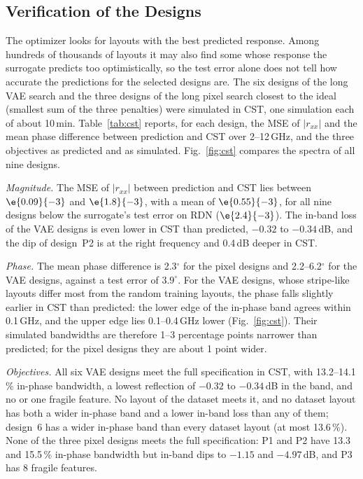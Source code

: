 \subsection{Verification of the Designs}
The optimizer looks for layouts with the best predicted response. Among hundreds of thousands of layouts it may also find some whose response the surrogate predicts too optimistically, so the test error alone does not tell how accurate the predictions for the selected designs are. The six designs of the long VAE search and the three designs of the long pixel search closest to the ideal (smallest sum of the three penalties) were simulated in CST, one simulation each of about 10\,min. Table~\ref{tab:cst} reports, for each design, the MSE of $|r_{xx}|$ and the mean phase difference between prediction and CST over 2--12\,GHz, and the three objectives as predicted and as simulated. Fig.~\ref{fig:cst} compares the spectra of all nine designs.

\emph{Magnitude.} The MSE of $|r_{xx}|$ between prediction and CST lies between $\e{0.09}{-3}$ and $\e{1.8}{-3}$, with a mean of $\e{0.55}{-3}$, for all nine designs below the surrogate's test error on RDN ($\e{2.4}{-3}$). The in-band loss of the VAE designs is even lower in CST than predicted, $-0.32$ to $-0.34$\,dB, and the dip of design~P2 is at the right frequency and 0.4\,dB deeper in CST.

\emph{Phase.} The mean phase difference is 2.3$^\circ$ for the pixel designs and 2.2--6.2$^\circ$ for the VAE designs, against a test error of $3.9^\circ$. For the VAE designs, whose stripe-like layouts differ most from the random training layouts, the phase falls slightly earlier in CST than predicted: the lower edge of the in-phase band agrees within 0.1\,GHz, and the upper edge lies 0.1--0.4\,GHz lower (Fig.~\ref{fig:cst}). Their simulated bandwidths are therefore 1--3 percentage points narrower than predicted; for the pixel designs they are about 1 point wider.

\emph{Objectives.} All six VAE designs meet the full specification in CST, with 13.2--14.1\,\% in-phase bandwidth, a lowest reflection of $-0.32$ to $-0.34$\,dB in the band, and no or one fragile feature. No layout of the dataset meets it, and no dataset layout has both a wider in-phase band and a lower in-band loss than any of them; design~6 has a wider in-phase band than every dataset layout (at most 13.6\,\%). None of the three pixel designs meets the full specification: P1 and P2 have 13.3 and 15.5\,\% in-phase bandwidth but in-band dips to $-1.15$ and $-4.97$\,dB, and P3 has 8 fragile features.

